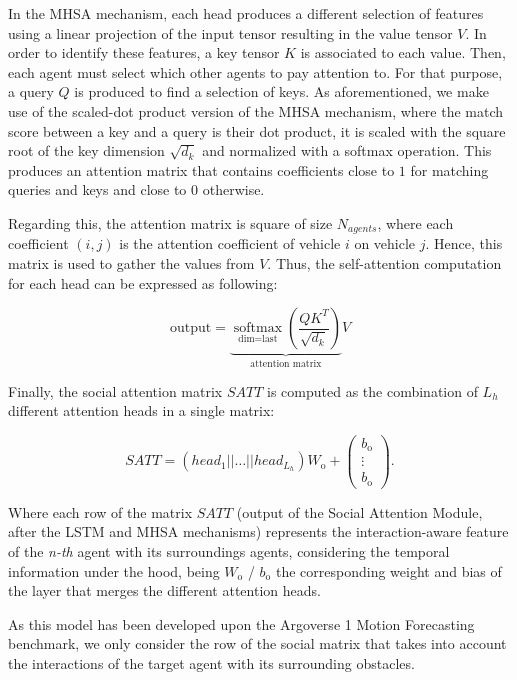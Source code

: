 In the \ac{MHSA} mechanism, each head produces a different selection of features using a linear projection of the input tensor resulting in the value tensor $V$. In order to identify these features, a key tensor $K$ is associated to each value. Then, each agent must select which other agents to pay attention to. For that purpose, a query $Q$ is produced to find a selection of keys. As aforementioned, we make use of the scaled-dot product version of the \ac{MHSA} mechanism, where the match score between a key and a query is their dot product, it is scaled with the square root of the key dimension $\sqrt{d_k}$ and normalized with a softmax operation. This produces an attention matrix that contains coefficients close to $1$ for matching queries and keys and close to $0$ otherwise.

Regarding this, the attention matrix is square of size $N_{agents}$, where each coefficient $(i, j)$ is the attention coefficient of vehicle $i$ on vehicle $j$. Hence, this matrix is used to gather the values from $V$. Thus, the self-attention computation for each head can be expressed as following:

\begin{equation}
	\text{output}=\underbrace{\underset{\text{dim}=\text{last}}{\operatorname{softmax}}\left(\frac{QK^T}{\sqrt{d_k}}\right)}_{\text{attention matrix}}V
	\label{eq:5_self_attention_single_head}
\end{equation}

Finally, the social attention matrix $SATT$ is computed as the combination of $L_h$ different attention heads in a single matrix:

\begin{equation}
	SATT = (head_1 || \dots || head_{L_h}) W_\mathrm{o} + 
	\begin{pmatrix}
		b_\mathrm{o}\\
		\vdots \\
		b_\mathrm{o}
	\end{pmatrix}.
\end{equation}

Where each row of the matrix $SATT$ (output of the Social Attention Module, after the \ac{LSTM} and \ac{MHSA} mechanisms) represents the interaction-aware feature of the \textit{n-th} agent with its surroundings agents, considering the temporal information under the hood, being $W_\mathrm{o}$ / $b_\mathrm{o}$ the corresponding weight and bias of the layer that merges the different attention heads.

As this model has been developed upon the Argoverse 1 Motion Forecasting benchmark, we only consider the row of the social matrix that takes into account the interactions of the target agent with its surrounding obstacles.

